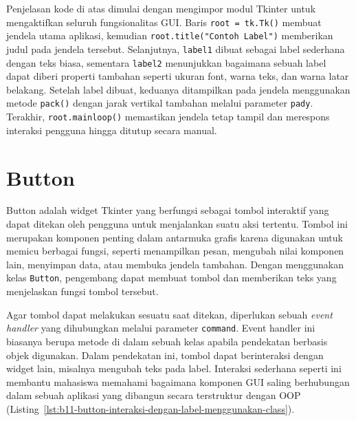 Penjelasan kode di atas dimulai dengan mengimpor modul Tkinter untuk mengaktifkan seluruh fungsionalitas GUI. Baris \texttt{root = tk.Tk()} membuat jendela utama aplikasi, kemudian \texttt{root.title("Contoh Label")} memberikan judul pada jendela tersebut. Selanjutnya, \texttt{label1} dibuat sebagai label sederhana dengan teks biasa, sementara \texttt{label2} menunjukkan bagaimana sebuah label dapat diberi properti tambahan seperti ukuran font, warna teks, dan warna latar belakang. Setelah label dibuat, keduanya ditampilkan pada jendela menggunakan metode \texttt{pack()} dengan jarak vertikal tambahan melalui parameter \texttt{pady}. Terakhir, \texttt{root.mainloop()} memastikan jendela tetap tampil dan merespons interaksi pengguna hingga ditutup secara manual.



\section{Button}

Button adalah widget Tkinter yang berfungsi sebagai tombol interaktif yang dapat ditekan oleh pengguna untuk menjalankan suatu aksi tertentu. Tombol ini merupakan komponen penting dalam antarmuka grafis karena digunakan untuk memicu berbagai fungsi, seperti menampilkan pesan, mengubah nilai komponen lain, menyimpan data, atau membuka jendela tambahan. Dengan menggunakan kelas \texttt{Button}, pengembang dapat membuat tombol dan memberikan teks yang menjelaskan fungsi tombol tersebut.

Agar tombol dapat melakukan sesuatu saat ditekan, diperlukan sebuah \textit{event handler} yang dihubungkan melalui parameter \texttt{command}. Event handler ini biasanya berupa metode di dalam sebuah kelas apabila pendekatan berbasis objek digunakan. Dalam pendekatan ini, tombol dapat berinteraksi dengan widget lain, misalnya mengubah teks pada label. Interaksi sederhana seperti ini membantu mahasiswa memahami bagaimana komponen GUI saling berhubungan dalam sebuah aplikasi yang dibangun secara terstruktur dengan OOP (Listing~\ref{lst:b11-button-interaksi-dengan-label-menggunakan-class}).


